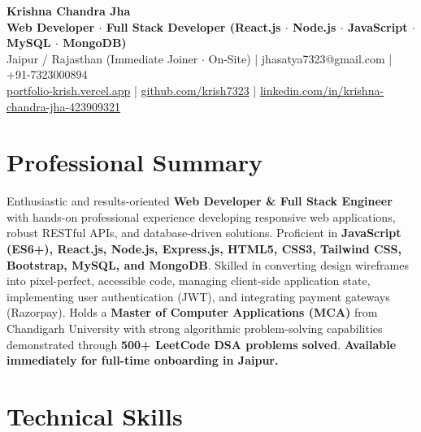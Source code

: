 \documentclass[a4paper,10pt]{article}
\begin{document}
\begin{center}

    {\LARGE \textbf{Krishna Chandra Jha}} \\[2.5pt]

    \textbf{Web Developer $\cdot$ Full Stack Developer (React.js $\cdot$ Node.js $\cdot$ JavaScript $\cdot$ MySQL $\cdot$ MongoDB)} \\[3.5pt]

    Jaipur / Rajasthan (Immediate Joiner $\cdot$ On-Site)
    \quad | \quad
    jhasatya7323@gmail.com
    \quad | \quad
    +91-7323000894
    \\[2.5pt]

    \href{https://portfolio-ashen-alpha-dv0whhsamo.vercel.app/}{portfolio-krish.vercel.app}
    \quad | \quad
    \href{https://github.com/krish7323}{github.com/krish7323}
    \quad | \quad
    \href{https://linkedin.com/in/krishna-chandra-jha-423909321}
    {linkedin.com/in/krishna-chandra-jha-423909321}

\end{center}

\section*{Professional Summary}

Enthusiastic and results-oriented \textbf{Web Developer \& Full Stack Engineer} with hands-on professional experience developing responsive web applications, robust RESTful APIs, and database-driven solutions. Proficient in \textbf{JavaScript (ES6+), React.js, Node.js, Express.js, HTML5, CSS3, Tailwind CSS, Bootstrap, MySQL, and MongoDB}. Skilled in converting design wireframes into pixel-perfect, accessible code, managing client-side application state, implementing user authentication (JWT), and integrating payment gateways (Razorpay). Holds a \textbf{Master of Computer Applications (MCA)} from Chandigarh University with strong algorithmic problem-solving capabilities demonstrated through \textbf{500+ LeetCode DSA problems solved}. \textbf{Available immediately for full-time onboarding in Jaipur.}

\section*{Technical Skills}
\end{document}
